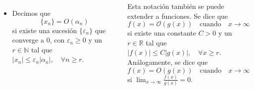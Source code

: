 \documentclass[20pt,margin=1in,innermargin=-4.5in,blockverticalspace=-0.25in]{tikzposter}
\begin{document}
\begin{columns}
{\begin{itemize}
        \item Decimos que $$\{ x_n \}= O(\alpha_n)$$ si existe una sucesión $\{ \varepsilon_n \}$ que converge a $0$, con $\varepsilon_n \ge 0$ y un $r \in \mathbb{N}$ tal que $|x_n| \leq \varepsilon_n|\alpha_n|, \quad \forall n \geq r.$
    \end{itemize}
    Esta notación también se puede extender a funciones. Se dice que
    \begin{equation*}
        f(x) = \mathcal{O}(g(x)) \quad \text{cuando} \quad x\to \infty
    \end{equation*}
    si existe una constante $C > 0$ y un $r \in \mathbb{R}$ tal que $|f(x)| \leq C|g(x)|, \quad \forall x \geq r$.
    Análogamente, se dice que
    \begin{equation*}
        f(x) = O(g(x)) \quad \text{cuando} \quad x\to \infty
    \end{equation*}
    si $\lim_{x\to \infty} \frac{f(x)}{g(x)} = 0$.
    }

\end{columns}
\end{document}
